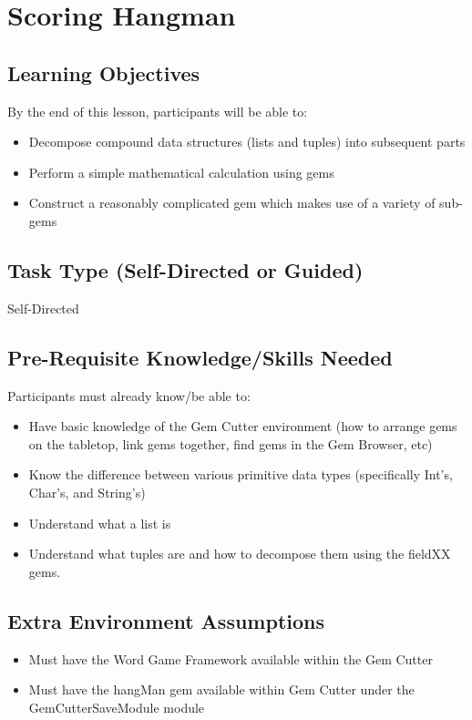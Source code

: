 \section{Scoring Hangman}
\label{sec:scoringHangman}

	\subsection*{Learning Objectives}

	By the end of this lesson, participants will be able to:

		\begin{itemize}
			\item Decompose compound data structures (lists and tuples) into subsequent parts
			\item Perform a simple mathematical calculation using gems
			\item Construct a reasonably complicated gem which makes use of a variety of sub-gems
		\end{itemize}

	\subsection*{Task Type (Self-Directed or Guided)}
	Self-Directed

	\subsection*{Pre-Requisite Knowledge/Skills Needed}

	Participants must already know/be able to:

		\begin{itemize}
			\item Have basic knowledge of the Gem Cutter environment (how to arrange gems on the tabletop, link gems together, find gems in the Gem Browser, etc)
			\item Know the difference between various primitive data types (specifically Int's, Char's, and String's)
			\item Understand what a list is
			\item Understand what tuples are and how to decompose them using the fieldXX gems.
		\end{itemize}

	\subsection*{Extra Environment Assumptions}
		\begin{itemize}
			\item Must have the Word Game Framework available within the Gem Cutter
			\item Must have the hangMan gem available within Gem Cutter under the GemCutterSaveModule module
		\end{itemize}


